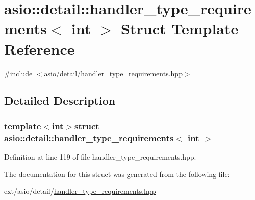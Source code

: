 \hypertarget{structasio_1_1detail_1_1handler__type__requirements}{}\section{asio\+:\+:detail\+:\+:handler\+\_\+type\+\_\+requirements$<$ int $>$ Struct Template Reference}
\label{structasio_1_1detail_1_1handler__type__requirements}


{\ttfamily \#include $<$asio/detail/handler\+\_\+type\+\_\+requirements.\+hpp$>$}



\subsection{Detailed Description}
\subsubsection*{template$<$int$>$struct asio\+::detail\+::handler\+\_\+type\+\_\+requirements$<$ int $>$}



Definition at line 119 of file handler\+\_\+type\+\_\+requirements.\+hpp.



The documentation for this struct was generated from the following file\+:\begin{DoxyCompactItemize}
\item 
ext/asio/detail/\hyperlink{handler__type__requirements_8hpp}{handler\+\_\+type\+\_\+requirements.\+hpp}\end{DoxyCompactItemize}
